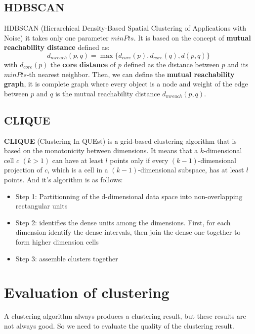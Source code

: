 \documentclass[12pt, openany]{report}
\theoremstyle{definition}
\begin{document}
\subsection{HDBSCAN}
HDBSCAN (Hierarchical Density-Based Spatial Clustering of Applications with Noise) it takes only one parameter $minPts$. It is based on the concept of \textbf{mutual reachability distance} defined as:
\begin{equation}
    d_{mreach}(p, q) = \max\{d_{core}(p), d_{core}(q), d(p, q)\}
\end{equation}
with $d_{core}(p)$ the \textbf{core distance} of $p$ defined as the distance between $p$ and its $minPts$-th nearest neighbor. Then, we can define the \textbf{mutual reachability graph}, it is complete graph where every object is a node and weight of the edge between $p$ and $q$ is the mutual reachability distance $d_{mreach}(p, q)$.
\subsection{CLIQUE}
\textbf{CLIQUE} (Clustering In QUEst) is a grid-based clustering algorithm that is based on the monotonicity between dimensions. It means that a $k$-dimensional cell $c$ $(k > 1)$ can have at least $l$ points only if every $(k - 1)$-dimensional projection of $c$, which is a cell in a $(k - 1)$-dimensional subspace, has at least $l$ points. And it's algorithm is as follows:
\begin{itemize}
    \item Step 1: Partitionning of the d-dimensional data space into non-overlapping rectangular units
    \item Step 2: identifies the dense units among the dimensions. First, for each dimension identify the dense intervals, then join the dense one together to form higher dimension cells
    \item Step 3: assemble clusters together
\end{itemize}
\section{Evaluation of clustering}
A clustering algorithm always produces a clustering result, but these results are not always good. So we need to evaluate the quality of the clustering result.
\end{document}
